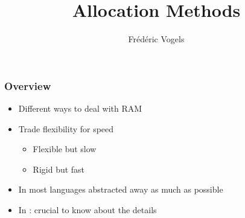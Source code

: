 \usepackage{fourier}
\usepackage{bbding}


\usetikzlibrary{shadows,shapes.multipart}

\title{Allocation Methods}
\author{Fr\'ed\'eric Vogels}






\begin{frame}
  \titlepage
\end{frame}

\begin{frame}
  \frametitle{Overview}
  \begin{itemize}
    \item Different ways to deal with RAM
    \item Trade flexibility for speed
          \begin{itemize}
            \item Flexible but slow
            \item Rigid but fast
          \end{itemize}
    \item In most languages abstracted away as much as possible
    \item In \cpp: crucial to know about the details
  \end{itemize}
\end{frame}






